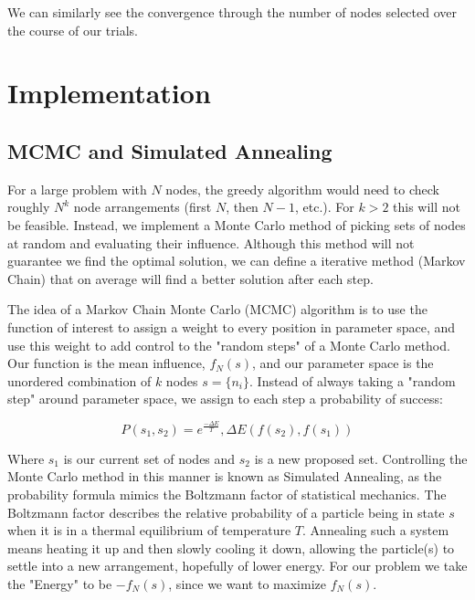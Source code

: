 \documentclass{article}
\begin{document}
		We can similarly see the convergence through the number of nodes selected over the course of our trials.\\


		
	\section{Implementation}
	
	\subsection{MCMC and Simulated Annealing}
	For a large problem with $N$ nodes, the greedy algorithm would need to check roughly $N^k$ node arrangements (first $N$, then $N-1$, etc.). For $k > 2$ this will not be feasible. Instead, we implement a Monte Carlo method of picking sets of nodes at random and evaluating their influence. Although this method will not guarantee we find the optimal solution, we can define a iterative method (Markov Chain) that on average will find a better solution after each step.
		
	The idea of a Markov Chain Monte Carlo (MCMC) algorithm is to use the function of interest to assign a weight to every position in parameter space, and use this weight to add control to the "random steps" of a Monte Carlo method. Our function is the mean influence, $f_N(s)$, and our parameter space is the unordered combination of $k$ nodes $s = \{n_i\}$. Instead of always taking a "random step" around parameter space, we assign to each step a probability of success:
		
		\begin{equation}
		\boxed{
			P(s_1,s_2) = e^\frac{-\Delta E}{T}, \Delta E(f(s_2),f(s_1))
		}
		\end{equation}
		
		Where $s_1$ is our current set of nodes and $s_2$ is a new proposed set. Controlling the Monte Carlo method in this manner is known as Simulated Annealing, as the probability formula mimics the Boltzmann factor of statistical mechanics. The Boltzmann factor describes the relative probability of a particle being in state $s$ when it is in a thermal equilibrium of temperature $T$. Annealing such a system means heating it up and then slowly cooling it down, allowing the particle(s) to settle into a new arrangement, hopefully of lower energy. For our problem we take the "Energy" to be $-f_N(s)$, since we want to maximize $f_N(s)$. 
		
\end{document}

